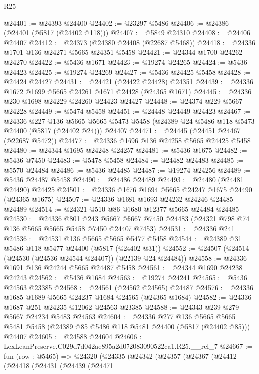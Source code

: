 \begin{lexlean}{R25}
\begin{coremodule}
@24401 := @24393 @24400
@24402 := @23297 @5486
@24406 := @24386 (@24401 (@5817 (@24402 @118)))
@24407 := @5849 @24310
@24408 := @24406 @24407
@24412 := @24373 (@24380 @24408 (@22687 @5468))
@24418 := @24336 @1701 @136 @24271 @5665 @24351 @5458
@24421 := @24344 @1700 @24262 @24270
@24422 := @5436 @1671
@24423 := @19274 @24265
@24424 := @5436 @24423
@24425 := @19274 @24269
@24427 := @5436 @24425 @5458
@24428 := @24424 @24427
@24431 := @24421 (@24422 @24428) @24351
@24439 := @24336 @1672 @1699 @5665 @24261 @1671 @24428 (@24365 @1671)
@24445 := @24336 @230 @1698 @24229 @24260 @24423 @24427
@24448 := @24374 @229 @5667 @24228
@24449 := @5474 @5458
@24451 := @24448 @24449 @24423
@24467 := @24336
    @227
    @136
    @5665
    @5665
    @5473
    @5458
    (@24389 @24 @5486 @118 @5473 @24400 (@5817 (@24402 @24)))
    @24407
@24471 := @24445 (@24451 @24467 (@22687 @5472))
@24477 := @24336 @1696 @136 @24258 @5665 @24425 @5458
@24480 := @24344 @1695 @24248 @24257
@24481 := @5436 @1675
@24482 := @5436 @7450
@24483 := @5478 @5458
@24484 := @24482 @24483
@24485 := @5570 @24484
@24486 := @5436 @24485
@24487 := @19274 @24256
@24489 := @5436 @24487 @5458
@24490 := @24486 @24489
@24493 := @24480 (@24481 @24490) @24425
@24501 := @24336 @1676 @1694 @5665 @24247 @1675 @24490 (@24365 @1675)
@24507 := @24336 @1681 @1693 @24232 @24246 @24485 @24489
@24514 := @24321 @510 @86 @1680 @12377 @5665 @24484 @24485
@24530 := @24336
    @801
    @243
    @5667
    @5667
    @7450
    @24483
    (@24321 @798 @74 @136 @5665 @5665 @5458 @7450 @24407 @7453)
@24531 := @24336 @241
@24536 := @24531 @136 @5665 @5665 @5477 @5458
@24544 := @24389 @31 @5486 @118 @5477 @24400 (@5817 (@24402 @31))
@24552 := @24507 (@24514 (@24530 (@24536 @24544 @24407)) (@22139 @24 @24484))
@24558 := @24336 @1691 @136 @24244 @5665 @24487 @5458
@24561 := @24344 @1690 @24238 @24243
@24562 := @5436 @1684
@24563 := @19274 @24241
@24565 := @5436 @24563 @23385
@24568 := @24561 (@24562 @24565) @24487
@24576 := @24336 @1685 @1689 @5665 @24237 @1684 @24565 (@24365 @1684)
@24582 := @24336 @1687 @251 @24235 @12062 @24563 @23385
@24588 := @24343 @239 @279 @5667 @24234 @5483 @24563
@24604 := @24336
    @277
    @136
    @5665
    @5665
    @5481
    @5458
    (@24389 @85 @5486 @118 @5481 @24400 (@5817 (@24402 @85)))
    @24407
@24605 := @24588 @24604
@24606 := LexLeanPreserve.C029d7d042ae895a2d072083090522ca1.R25.__rel_7
@24667 := fun (row : @5465) =>
  @24320
    (@24335
      (@24342
        (@24357
          (@24367
            (@24412
              (@24418
                (@24431
                  (@24439
                    (@24471

\end{coremodule}
\end{lexlean}
